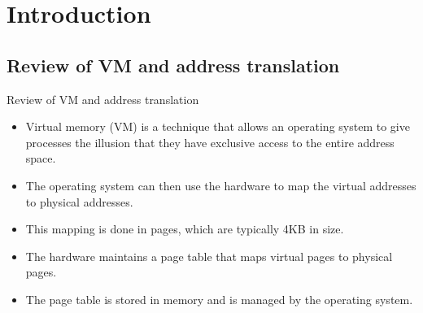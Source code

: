 \section{Introduction}

\subsection{Review of VM and address translation}
\begin{frame}{Review of VM and address translation}
  \begin{itemize}
    \item Virtual memory (VM) is a technique that allows an operating system to give processes the illusion that they have exclusive access to the entire address space.
    \item The operating system can then use the hardware to map the virtual addresses to physical addresses.
    \item This mapping is done in pages, which are typically 4KB in size.
    \item The hardware maintains a page table that maps virtual pages to physical pages.
    \item The page table is stored in memory and is managed by the operating system.
  \end{itemize}
\end{frame}
